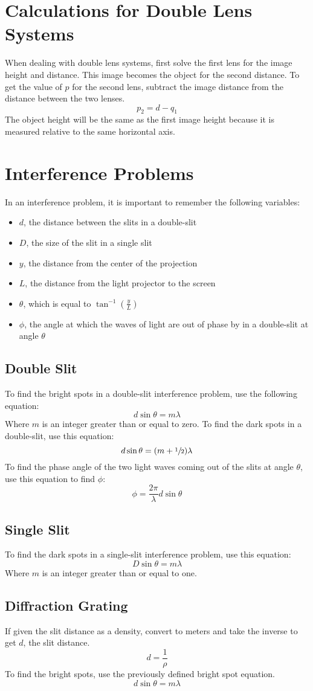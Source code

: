 \documentclass{article}
\begin{document}
\section{Calculations for Double Lens Systems}
When dealing with double lens systems, first solve the first lens for the image height and distance.  This image becomes the object for the second distance.  To get the value of $p$ for the second lens, subtract the image distance from the distance between the two lenses.
\[p_2=d-q_1\]
The object height will be the same as the first image height because it is measured relative to the same horizontal axis.
\section{Interference Problems}
In an interference problem, it is important to remember the following variables:
\begin{itemize}
\item $d$, the distance between the slits in a double-slit
\item $D$, the size of the slit in a single slit
\item $y$, the distance from the center of the projection
\item $L$, the distance from the light projector to the screen
\item $\theta$, which is equal to $\tan^{-1}\left(\frac{y}{L}\right)$
\item $\phi$, the angle at which the waves of light are out of phase by in a double-slit at angle $\theta$
\end{itemize}
\subsection{Double Slit}
To find the bright spots in a double-slit interference problem, use the following equation:
\[d\sin\theta=m\lambda\]
Where $m$ is an integer greater than or equal to zero.
To find the dark spots in a double-slit, use this equation:
\[d\sin\theta=(m+\sfrac{1}{2})\lambda\]
To find the phase angle of the two light waves coming out of the slits at angle $\theta$, use this equation to find $\phi$:
\[\phi=\frac{2\pi}{\lambda}d\sin\theta\]
\subsection{Single Slit}
To find the dark spots in a single-slit interference problem, use this equation:
\[D\sin\theta=m\lambda\]
Where $m$ is an integer greater than or equal to one.
\subsection{Diffraction Grating}
If given the slit distance as a density, convert to meters and take the inverse to get $d$, the slit distance.
\[d=\frac{1}{\rho}\]
To find the bright spots, use the previously defined bright spot equation.
\[d\sin\theta=m\lambda\]
\end{document}
